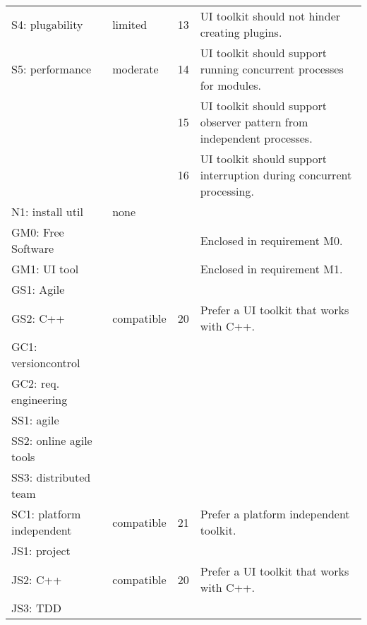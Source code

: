 \begin{center}
\begin{longtable}{ll||cp{21em}}
        S4: plugability      & limited      & 13  & UI toolkit should not hinder creating plugins.\\
        S5: performance	     & moderate     & 14  & UI toolkit should support running concurrent processes for modules.\\
	                         &              & 15  & UI toolkit should support observer pattern from independent processes.\\
	                         &              & 16  & UI toolkit should support interruption during concurrent processing.\\
        N1: install util     & none    		&     & \\\hline
		GM0: Free Software  &              &     & Enclosed in requirement M0.\\
        GM1: UI tool	    &              &     & Enclosed in requirement M1.\\
        GS1: Agile	        &              &     & \\
        GS2: C++	        & compatible   & 20  & Prefer a UI toolkit that works with C++.\\
        GC1: versioncontrol &              &     & \\
        GC2: req. engineering
						    &              &     & \\\hline
        SS1: agile	        &              &     & \\
        SS2: online agile tools
							&              &     & \\
        SS3: distributed team
							&              &     & \\
        SC1: platform independent
							& compatible   & 21  & Prefer a platform independent toolkit.\\\hline
		JS1: project        &              &     & \\
        JS2: C++	        & compatible   & 20  & Prefer a UI toolkit that works with C++.\\
		JS3: TDD			&              &     & \\
    \end{longtable}
    \label{tab:uitool-requirements}
\end{center}
